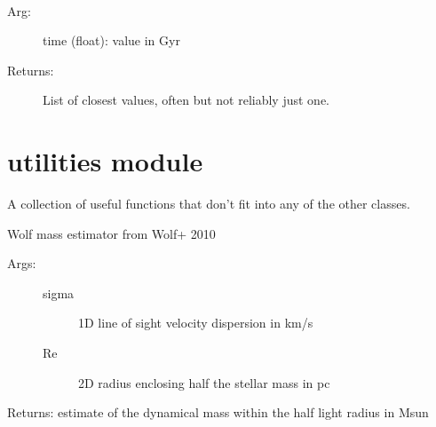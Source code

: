 \documentclass[letterpaper,10pt,english]{sphinxmanual}
\begin{document}
\begin{fulllineitems}
\begin{fulllineitems}
\label{\detokenize{timecourse:galaxy.timecourse.TimeCourse.time2snap}}~\begin{description}
\item[{Arg:}] \leavevmode
time (float): value in Gyr

\item[{Returns:}] \leavevmode
List of closest values, often but not reliably just one.

\end{description}

\end{fulllineitems}


\end{fulllineitems}



\chapter{utilities module}
\label{\detokenize{utilities:utilities-module}}\label{\detokenize{utilities::doc}}
A collection of useful functions that don’t fit into any of the other classes.

\label{\detokenize{utilities:module-galaxy.utilities}}

\begin{fulllineitems}
\label{\detokenize{utilities:galaxy.utilities.wolf_mass}}
Wolf mass estimator from Wolf+ 2010
\begin{description}
\item[{Args:}] \leavevmode\begin{description}
\item[{sigma}] \leavevmode{[}{]}
1D line of sight velocity dispersion in km/s

\item[{Re}] \leavevmode{[}{]}
2D radius enclosing half the stellar mass in pc

\end{description}

\end{description}

Returns: estimate of the dynamical mass within the half light radius in Msun

\end{fulllineitems}
\end{document}

